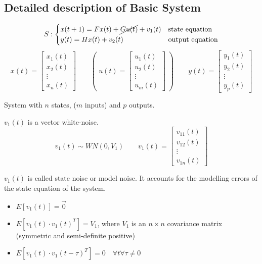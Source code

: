 \subsection{Detailed description of Basic System}

\[
    S: \begin{cases}
        x(t+1) = Fx(t) + \cancel{Gu(t)} + v_1(t) & \text{state equation}\\
        y(t) = Hx(t) + v_2(t) & \text{output equation}
    \end{cases}
\]
\[
    x(t) = \begin{bmatrix}
        x_1(t) \\
        x_2(t) \\
        \vdots \\
        x_n(t)
    \end{bmatrix}
    \qquad
    \left(\;u(t) = \begin{bmatrix}
        u_1(t) \\
        u_2(t) \\
        \vdots \\
        u_m(t)
    \end{bmatrix}\;\right)
    \qquad
    y(t) = \begin{bmatrix}
        y_1(t) \\
        y_2(t) \\
        \vdots \\
        y_p(t)
    \end{bmatrix}
\]

System with $n$ states, ($m$ inputs) and $p$ outputs.

$v_1(t)$ is a vector white-noise.
\[
    v_1(t) \sim WN(0, V_1) \qquad v_1(t) = \begin{bmatrix}
        v_{11}(t) \\
        v_{12}(t) \\
        \vdots \\
        v_{1n}(t)
    \end{bmatrix}
\]

$v_1(t)$ is called state noise or model noise.
It accounts for the modelling errors of the state equation of the system.

\begin{itemize}
    \item $E[v_1(t)] = \vec{0}$
    \item $E[v_1(t) \cdot v_1(t)^T] = V_1$, where $V_1$ is an $n\times n$ covariance matrix (symmetric and semi-definite positive)
    \item $E[v_1(t) \cdot v_1(t-\tau)^T] = 0 \quad \forall t \forall \tau \ne 0$
\end{itemize}

